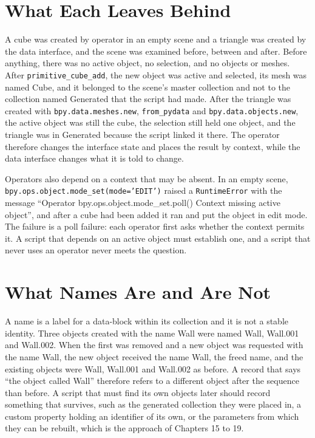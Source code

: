 \section{What Each Leaves Behind}

A cube was created by operator in an empty scene and a triangle was created by the data interface, and the scene was examined before, between and after. Before anything, there was no active object, no selection, and no objects or meshes. After \texttt{primitive\_cube\_add}, the new object was active and selected, its mesh was named Cube, and it belonged to the scene's master collection and not to the collection named Generated that the script had made. After the triangle was created with \texttt{bpy.data.meshes.new}, \texttt{from\_pydata} and \texttt{bpy.data.objects.new}, the active object was still the cube, the selection still held one object, and the triangle was in Generated because the script linked it there. The operator therefore changes the interface state and places the result by context, while the data interface changes what it is told to change.

Operators also depend on a context that may be absent. In an empty scene, \texttt{bpy.ops.object.mode\_set(mode='EDIT')} raised a \texttt{RuntimeError} with the message ``Operator bpy.ops.object.mode\_set.poll() Context missing active object'', and after a cube had been added it ran and put the object in edit mode. The failure is a poll failure: each operator first asks whether the context permits it. A script that depends on an active object must establish one, and a script that never uses an operator never meets the question.

\section{What Names Are and Are Not}

A name is a label for a data-block within its collection and it is not a stable identity. Three objects created with the name Wall were named Wall, Wall.001 and Wall.002. When the first was removed and a new object was requested with the name Wall, the new object received the name Wall, the freed name, and the existing objects were Wall, Wall.001 and Wall.002 as before. A record that says ``the object called Wall'' therefore refers to a different object after the sequence than before. A script that must find its own objects later should record something that survives, such as the generated collection they were placed in, a custom property holding an identifier of its own, or the parameters from which they can be rebuilt, which is the approach of Chapters 15 to 19.

